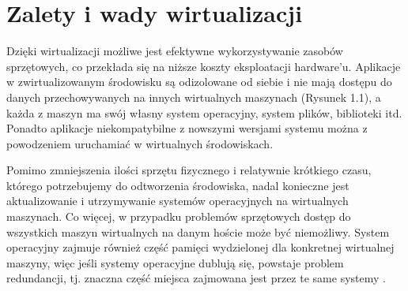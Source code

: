 \section{Zalety i wady wirtualizacji}
Dzięki wirtualizacji możliwe jest efektywne wykorzystywanie zasobów sprzętowych, co przekłada się na niższe koszty eksploatacji hardware'u. Aplikacje w zwirtualizowanym środowisku są odizolowane od siebie i nie mają dostępu do danych przechowywanych na innych wirtualnych maszynach  (Rysunek 1.1), a każda z maszyn ma swój własny system operacyjny, system plików, biblioteki itd. Ponadto aplikacje niekompatybilne z nowszymi wersjami systemu można z powodzeniem uruchamiać w wirtualnych środowiskach. 

Pomimo zmniejszenia ilości sprzętu fizycznego i relatywnie krótkiego czasu, którego potrzebujemy do odtworzenia środowiska, nadal konieczne jest aktualizowanie i utrzymywanie systemów operacyjnych na wirtualnych maszynach. Co więcej, w przypadku problemów sprzętowych dostęp do wszystkich maszyn wirtualnych na danym hoście może być niemożliwy. System operacyjny zajmuje również część pamięci wydzielonej dla konkretnej wirtualnej maszyny, więc jeśli systemy operacyjne dublują się, powstaje problem redundancji, tj. znaczna część miejsca zajmowana jest przez te same systemy \cite{ibm}. 
\newpage

